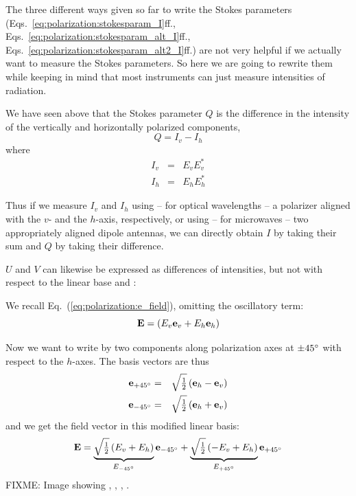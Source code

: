 \label{sec:polarization:measuring}
The three different ways given so far to write the Stokes parameters
(Eqs.~\ref{eq:polarization:stokesparam_I}ff.,
Eqs.~\ref{eq:polarization:stokesparam_alt_I}ff.,
Eqs.~\ref{eq:polarization:stokesparam_alt2_I}ff.)  are not very
helpful if we actually want to measure the Stokes parameters. So here
we are going to rewrite them while keeping in mind that most
instruments can just measure intensities of radiation.

We have seen above that the Stokes parameter $Q$ is the difference in
the intensity of the vertically and horizontally polarized components,
\begin{equation}
  \label{eq:polarization:Q_Idiff}
  Q = I_v - I_h
\end{equation}
where
\begin{eqnarray}
  \label{eq:polarization:Iv}
  I_v &=& E_v E_v^\ast\\
  \label{eq:polarization:Iv}
  I_h &=& E_h E_h^\ast
\end{eqnarray}
  
Thus if we measure $I_v$ and $I_h$ using -- for optical wavelengths --
a polarizer aligned with the $v$- and the $h$-axis, respectively, or
using -- for microwaves -- two appropriately aligned dipole antennas, we
can directly obtain $I$ by taking their sum and $Q$ by taking their
difference.

$U$ and $V$ can likewise be expressed as differences of intensities, but not
with respect to the linear base \eVrt and \eHor:

We recall Eq.~(\ref{eq:polarization:e_field}), omitting the
oscillatory term:
\begin{equation}
  \label{eq:polarization:E_linbase}
  \mathbf{E}= \left(E_v \mathbf{e}_v +  E_h \mathbf{e}_h \right) 
\end{equation}

Now we want to write  by two components along polarization axes at
$\pm 45^\circ$ with respect to the $h$-axes. The basis vectors are
thus
\begin{eqnarray}
  \label{eq:polarization:e_p45}
  \mathbf{e}_{+45^\circ} &=& \sqrt{\textstyle\frac{1}{2}} \left( \mathbf{e}_h - \mathbf{e}_v \right) \\
  \label{eq:polarization:e_p45}
  \mathbf{e}_{-45^\circ} &=& \sqrt{\textstyle\frac{1}{2}} \left( \mathbf{e}_h + \mathbf{e}_v \right) 
\end{eqnarray}
and we get the field vector in this modified linear basis:
\begin{equation}
  \label{eq:polarization:E_lin45base}
  \mathbf{E} = \underbrace{
               \sqrt{\textstyle\frac{1}{2}}\left(E_v +  E_h \right)}_{E_{-45^\circ}} 
               \mathbf{e}_{-45^\circ} 
              + \underbrace{
               \sqrt{\textstyle\frac{1}{2}}\left( -E_v +  E_h \right)}_{E_{+45^\circ}} 
               \mathbf{e}_{+45^\circ} 
\end{equation}
%
FIXME: Image showing \eVrt, \eHor, \ePls, \eMin.

